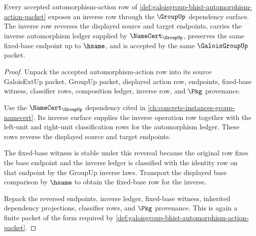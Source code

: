 \begin{theorem}
\label{thm:galoisgroup-inverse-closure}
Every accepted automorphism-action row of
\autoref{def:galoisgroup-bhist-automorphism-action-packet} exposes an inverse
row through the $\GroupUp$ dependency surface. The inverse row reverses the
displayed source and target endpoints, carries the inverse automorphism ledger
supplied by $\NameCert_{\GroupUp}$, preserves the same fixed-base endpoint up
to $\hsame$, and is accepted by the same $\GaloisGroupUp$ packet.
\end{theorem}
\begin{proof}
Unpack the accepted automorphism-action row into its source GaloisExtUp
packet, GroupUp packet, displayed action row, endpoints, fixed-base witness,
classifier rows, composition ledger, inverse row, and $\Pkg$ provenance.

Use the $\NameCert_{\GroupUp}$ dependency cited in
\autoref{ch:concrete-instances-group-namecert}. Its inverse surface supplies
the inverse operation row together with the left-unit and right-unit
classification rows for the automorphism ledger. These rows reverse the
displayed source and target endpoints.

The fixed-base witness is stable under this reversal because the original row
fixes the base endpoint and the inverse ledger is classified with the identity
row on that endpoint by the GroupUp inverse laws. Transport the displayed
base comparison by $\hsame$ to obtain the fixed-base row for the inverse.

Repack the reversed endpoints, inverse ledger, fixed-base witness, inherited
dependency projections, classifier rows, and $\Pkg$ provenance. This is again
a finite packet of the form required by
\autoref{def:galoisgroup-bhist-automorphism-action-packet}.
\end{proof}

